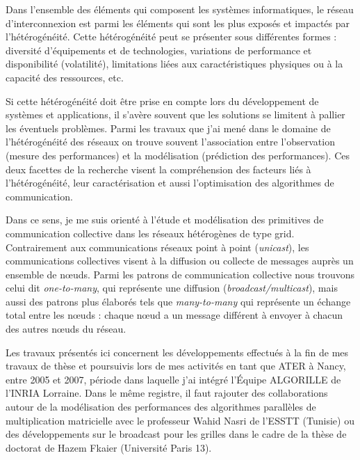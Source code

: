 \begin{resume}
Dans l'ensemble des éléments qui composent les systèmes informatiques, le réseau d'interconnexion est parmi les éléments qui sont les plus exposés et impactés par l'hétérogénéité. Cette hétérogénéité peut se présenter sous différentes formes : diversité d'équipements et de technologies, variations de performance et disponibilité (volatilité), limitations liées aux caractéristiques physiques ou à la capacité des ressources, etc. 

Si cette hétérogénéité doit être prise en compte lors du développement de systèmes et applications, il s'avère souvent que les solutions se limitent à pallier les éventuels problèmes. Parmi les travaux que j'ai mené dans le domaine de l'hétérogénéité des réseaux on trouve souvent l'association entre l'observation (mesure des performances) et la modélisation (prédiction des performances). Ces deux facettes de la recherche visent la compréhension des facteurs liés à l'hétérogénéité, leur caractérisation et aussi l'optimisation des algorithmes de communication.

Dans ce sens, je me suis orienté à l'étude et modélisation des primitives de communication collective dans les réseaux hétérogènes de type grid. Contrairement aux communications réseaux point à point (\textit{unicast}), les communications collectives visent à la diffusion ou collecte de messages auprès un ensemble de n{\oe}uds. Parmi les patrons de communication collective nous trouvons celui dit \textit{one-to-many}, qui représente une diffusion (\textit{broadcast/multicast}), mais aussi des patrons plus élaborés tels que \textit{many-to-many} qui représente un échange total entre les n{\oe}uds : chaque n{\oe}ud a un message différent à envoyer à chacun des autres n{\oe}uds du réseau. 

Les travaux présentés ici concernent les développements effectués à la fin de mes travaux de thèse et poursuivis lors de mes activités en tant que ATER à Nancy, entre 2005 et 2007, période dans laquelle j'ai intégré l'Équipe ALGORILLE de l'INRIA Lorraine. Dans le même registre, il faut rajouter des collaborations autour de la modélisation des performances des algorithmes parallèles de multiplication matricielle avec le professeur Wahid Nasri de l'ESSTT (Tunisie) ou des développements sur le broadcast pour les grilles dans le cadre de la thèse de doctorat de Hazem Fkaier (Université Paris 13).



\end{resume}
